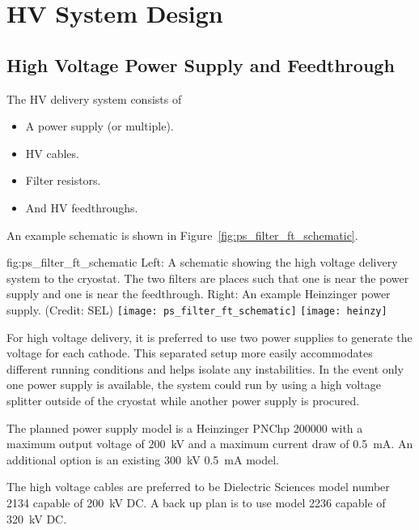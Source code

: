 \section{HV System Design}
\label{sec:fddp-hv-design}

\subsection {High Voltage Power Supply and Feedthrough}
The HV delivery system consists of
\begin{itemize}
\item A power supply (or multiple).
\item HV cables.
\item Filter resistors.
\item And HV feedthroughs.
\end{itemize}
\noindent An example schematic is shown in Figure~\ref{fig:ps_filter_ft_schematic}.

\begin{dunefigure}{fig:ps_filter_ft_schematic}
{Left:  A schematic showing the high voltage delivery system to the cryostat.  The two filters are places such that one is near the power supply and one is near the feedthrough. Right:  An example Heinzinger power supply.  (Credit: SEL)}
\texttt{[image: ps\_filter\_ft\_schematic]}
\texttt{[image: heinzy]}
\end{dunefigure}

For high voltage delivery, it is preferred to use two power supplies to generate the voltage for each cathode. This separated setup more easily accommodates different running conditions and helps isolate any instabilities.  In the event only one power supply is available, the system could run by using a high voltage splitter outside of the cryostat while another power supply is procured.

The planned power supply model is a Heinzinger PNChp 200000 with a maximum output voltage of \SI{200}{kV} and a maximum current draw of \SI{0.5}{mA}.  An additional option is an existing \SI{300}{kV} \SI{0.5}{mA} model. 

The high voltage cables are preferred to be Dielectric Sciences model number 2134 capable of \SI{200}{kV} DC.  A back up plan is to use model 2236 capable of \SI{320}{kV} DC.  

